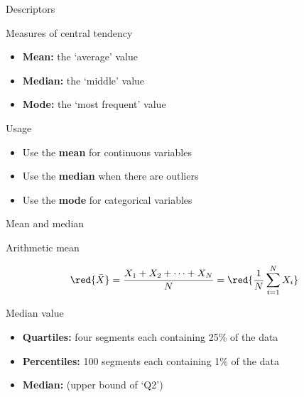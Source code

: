 \documentclass[t]{beamer}
\begin{document}
	\begin{frame}[t]{Descriptors}

	  \begin{block}{Measures of central tendency}
  	
			\begin{itemize}
				\item \textbf{Mean:} the `average' value
				\item \textbf{Median:} the `middle' value
				\item \textbf{Mode:} the `most frequent' value
			\end{itemize}
	
	  \end{block}
  
	  \begin{block}{Usage}
			\begin{itemize}
				\item Use the \textbf{mean} for continuous variables %
					\hfill {}
				\item Use the \textbf{median} when there are outliers %
					\hfill {}
				\item Use the \textbf{mode} for categorical variables %
					\hfill {}
			\end{itemize}
	  \end{block}

	\end{frame}
		
	\begin{frame}[t]{Mean and median}

	  \begin{block}{Arithmetic mean}
  	
			$$\red{\bar{X}} = \frac{X_1 + X_2 + \cdots + X_N}{N} = %
				\red{\frac{1}{N} \sum_{i = 1}^N X_i}$$
	
	  \end{block}
  
	  \begin{block}{Median value}
			\begin{itemize}
				\item \textbf{Quartiles:} four segments each containing %
				25\% of the data
				\item \textbf{Percentiles:} 100 segments each containing %
				1\% of the data
				\item \textbf{Median:}  (upper bound of `Q2') 
			\end{itemize}
	  \end{block}

	\end{frame}
\end{document}

